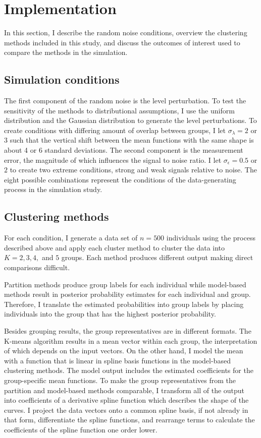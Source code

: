 \section{Implementation}
In this section, I describe the random noise conditions, overview the clustering methods included in this study, and discuss the outcomes of interest used to compare the methods in the simulation. 

\subsection{Simulation conditions}
The first component of the random noise is the level perturbation.  To test the sensitivity of the methods to distributional assumptions, I use the uniform distribution and the Gaussian distribution to generate the level perturbations. To create conditions with differing amount of overlap between groups, I let $\sigma_{\lambda}=2$ or $3$ such that the vertical shift between the mean functions with the same shape is about 4 or 6 standard deviations. The second component is the measurement error, the magnitude of which influences the signal to noise ratio. I let $\sigma_{\epsilon}=0.5$ or $2$ to create two extreme conditions, strong and weak signals relative to noise. The eight possible combinations represent the conditions of the data-generating process in the simulation study. 

\subsection{Clustering methods}
For each condition, I generate a data set of $n=500$ individuals using the process described above and apply each cluster method to cluster the data into $K=2,3,4,$ and $5$ groups. Each method produces different output making direct comparisons difficult. 

Partition methods produce group labels for each individual while model-based methods result in posterior probability estimates for each individual and group. Therefore, I translate the estimated probabilities into group labels by placing individuals into the group that has the highest posterior probability.

Besides grouping results, the group representatives are in different formats. The K-means algorithm results in a mean vector within each group, the interpretation of which depends on the input vectors. On the other hand, I model the mean with a function that is linear in spline basis functions in the model-based clustering methods. The model output includes the estimated coefficients for the group-specific mean functions. To make the group representatives from the partition and model-based methods comparable, I transform all of the output into coefficients of a derivative spline function which describes the shape of the curves. I project the data vectors onto a common spline basis, if not already in that form, differentiate the spline functions, and rearrange terms to calculate the coefficients of the spline function one order lower. 

